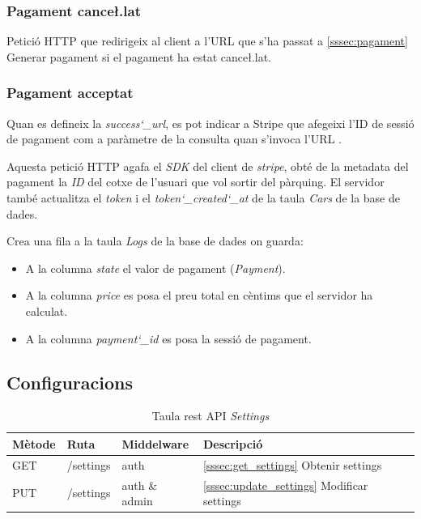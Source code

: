 \subsubsection{Pagament cance\l.lat}
\label{sssec:pagament_error}

Petició HTTP que redirigeix al client a l'URL que s'ha passat a \autoref{sssec:pagament}{ Generar pagament}
si el pagament ha estat cance\l.lat.

\subsubsection{Pagament acceptat}
\label{sssec:pagament_success}

Quan es defineix la \emph{success\char`_url}, es pot indicar a Stripe que afegeixi l'ID de sessió de pagament
com a paràmetre de la consulta quan s'invoca l'URL \autocite{cashier_laravel_checkouts}.

Aquesta petició HTTP agafa el \emph{SDK} del client de \emph{stripe}, obté de la metadata
del pagament la \emph{ID} del cotxe de l'usuari que vol sortir del pàrquing. El servidor
també actualitza el \emph{token} i el \emph{token\char`_created\char`_at} de la taula
\emph{Cars} de la base de dades.

Crea una fila a la taula \emph{Logs} de la base de dades on guarda:
\begin{itemize}
    \item A la columna \emph{state} el valor de pagament (\emph{Payment}).
    \item A la columna \emph{price} es posa el preu total en cèntims que el servidor ha calculat.
    \item A la columna \emph{payment\char`_id} es posa la sessió de pagament.
\end{itemize}

\subsection{Configuracions}


\begin{table}[H]
\centering
\begin{tabular}{llll}
\hline
\textbf{Mètode} & \textbf{Ruta} & \textbf{Middelware} & \textbf{Descripció} \\ \hline
GET             & /settings   & auth & \autoref{sssec:get_settings}{ Obtenir settings}     \\ \hline
PUT             & /settings   & auth \& admin &  \autoref{sssec:update_settings}{ Modificar settings}     \\ \hline
\end{tabular}
\caption{Taula rest API \emph{Settings}}
\label{tab:my-settings-api-table}
\end{table}

